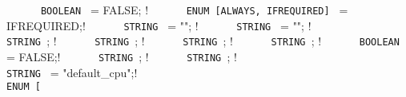 {\lstinline!      BOOLEAN ! = FALSE;    ! \newline
\lstinline!      ENUM [ALWAYS, IFREQUIRED] ! = IFREQUIRED;! \newline
\lstinline!      STRING ! = "";      ! \newline
\lstinline!      STRING ! = "";      ! \newline
\lstinline!      ! \newline
\lstinline!      STRING !;        ! \newline
\lstinline!      STRING !;        ! \newline
\lstinline!      STRING !;        ! \newline
\lstinline!      STRING !;        ! \newline
\lstinline!      BOOLEAN ! = FALSE;! \newline
\lstinline!      STRING !;          ! \newline
\lstinline!      STRING !;          ! \newline
\lstinline!                                                   ! \newline
\lstinline!      STRING ! = "default_cpu";! \newline
\lstinline!                                                   ! \newline
\lstinline!      ENUM [                                       ! \newline
}
